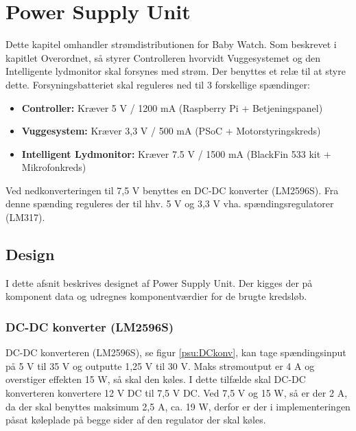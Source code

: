 \chapter{Power Supply Unit}

Dette kapitel omhandler strømdistributionen for Baby Watch. Som beskrevet i kapitlet Overordnet, så styrer Controlleren hvorvidt Vuggesystemet og den Intelligente lydmonitor skal forsynes med strøm. Der benyttes et relæ til at styre dette. Forsyningsbatteriet skal reguleres ned til 3 forskellige spændinger:

\begin{itemize}
\item \textbf{Controller:} Kræver 5 V / 1200 mA (Raspberry Pi + Betjeningspanel)

\item \textbf{Vuggesystem:} Kræver 3,3 V / 500 mA (PSoC + Motorstyringskreds)

\item \textbf{Intelligent Lydmonitor:} Kræver 7.5 V / 1500 mA (BlackFin 533 kit + Mikrofonkreds)
\end{itemize}

Ved nedkonverteringen til 7,5 V benyttes en DC-DC konverter (LM2596S). Fra denne spænding reguleres der til hhv. 5 V og 3,3 V vha. spændingsregulatorer (LM317). 

\section{Design}

I dette afsnit beskrives designet af Power Supply Unit. Der kigges der på komponent data og udregnes komponentværdier for de brugte kredsløb.

\subsection*{DC-DC konverter (LM2596S)}

DC-DC konverteren (LM2596S), se figur \ref{psu:DCkonv}, kan tage spændingsinput på 5 V til 35 V og outputte 1,25 V til 30 V. Maks strømoutput er 4 A og overstiger effekten 15 W, så skal den køles. I dette tilfælde skal DC-DC konverteren konvertere 12 V DC til 7,5 V DC. Ved 7,5 V og 15 W, så er der 2 A, da der skal benyttes maksimum 2,5 A, ca. 19 W, derfor er der i implementeringen påsat køleplade på begge sider af den regulator der skal køles. 



